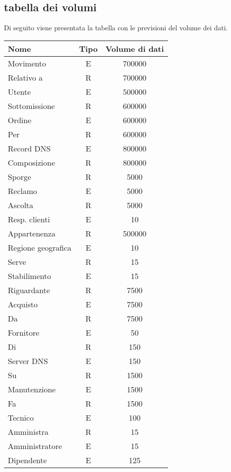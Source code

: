 \documentclass[11pt,a4paper] {article}
\begin{document}
\subsection{tabella dei volumi}
Di seguito viene presentata la tabella con le previsioni del volume dei dati.
\newline
\small
\begin{tabular} {| l | c | c |}
\hline
Nome & Tipo & Volume di dati \\ \hline
Movimento & E & 700000 \\ \hline
Relativo a & R & 700000 \\ \hline
Utente & E & 500000 \\ \hline
Sottomissione & R & 600000 \\ \hline
Ordine & E & 600000 \\ \hline
Per & R & 600000 \\ \hline
Record DNS & E & 800000 \\ \hline
Composizione & R & 800000 \\ \hline
Sporge & R & 5000 \\ \hline
Reclamo & E & 5000 \\ \hline
Ascolta & R & 5000 \\ \hline
Resp. clienti & E & 10 \\ \hline
Appartenenza & R & 500000 \\ \hline
Regione geografica & E & 10 \\ \hline
Serve & R & 15 \\ \hline
Stabilimento & E & 15 \\ \hline
Riguardante & R & 7500 \\ \hline
Acquisto & E & 7500 \\ \hline
Da & R & 7500 \\ \hline
Fornitore & E & 50 \\ \hline
Di & R & 150 \\ \hline
Server DNS & E & 150 \\ \hline
Su & R & 1500 \\ \hline
Manutenzione & E & 1500 \\ \hline
Fa & R & 1500 \\ \hline
Tecnico & E & 100 \\ \hline
Amministra & R & 15 \\ \hline
Amministratore & E & 15 \\ \hline
Dipendente & E & 125 \\ \hline
\end{tabular}
\newpage
\end{document}
